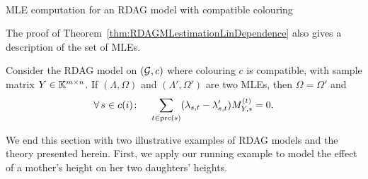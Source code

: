 \begin{algorithm}[h]
	\label{algo:RDAG-MLE} 
	\SetAlgoLined
	\BlankLine
	\caption{ {\cite[Algorithm~1]{RDAG}}\\MLE computation for an RDAG model with compatible colouring}
\end{algorithm}

The proof of Theorem~\ref{thm:RDAGMLestimationLinDependence} also gives a description of the set of MLEs.

\begin{cor} \label{cor:RDAG-MLEs} %
	Consider the RDAG model on $(\mathcal{G}, c)$ where colouring $c$ is compatible, 
	with sample matrix $Y \in \mathbb K^{m \times n}$. If $(\Lambda, \Omega)$ and $(\Lambda',\Omega')$ are two MLEs, then $\Omega = \Omega'$ and 
		\[ \forall \, s \in c(i) \colon \quad \sum_{t \in \operatorname{prc}(s)} (\lambda_{s,t} - \lambda'_{s,t}) M_{Y,s}^{(t)} = 0 . \]
\end{cor}

We end this section with two illustrative examples of RDAG models and the theory presented herein. First, we apply our running example to model the effect of a mother's height on her two daughters' heights.

